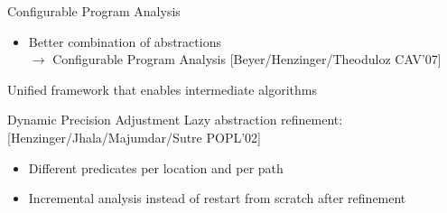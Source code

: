 \begin{frame}{Configurable Program Analysis}
  \begin{itemize}
    \item Better combination of abstractions\\
    \textbf{$\rightarrow$} Configurable Program Analysis  \hspace{0.1cm}\textcolor{sosyblue}{\tiny{[Beyer/Henzinger/Theoduloz CAV'07]}}
  \end{itemize}

  \medskip
  \begin{minipage}[b]{\textwidth}{
  }

  \vspace{1.5cm}
  Unified framework that enables intermediate algorithms
\end{minipage}
\end{frame}


\begin{frame}{Dynamic Precision Adjustment}
Lazy abstraction refinement:\hspace{0.1cm}\textcolor{sosyblue}{\tiny{[Henzinger/Jhala/Majumdar/Sutre POPL'02]}}
\begin{itemize}
  \item Different predicates per location and per path
  \item Incremental analysis instead of restart from scratch after refinement
\end{itemize}
\end{frame}


